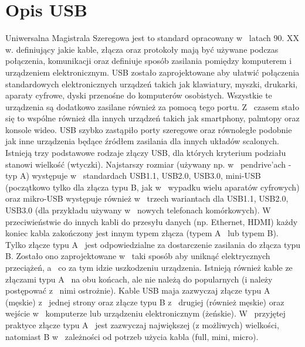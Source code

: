 \documentclass{BscUS}
\begin{document}
\section{Opis USB}
\label{USBStandardChapter}
Uniwersalna Magistrala Szeregowa jest to standard opracowany w~ latach 90. XX w. definiujący jakie kable, złącza oraz protokoły mają być używane podczas połączenia, komunikacji oraz definiuje sposób zasilania pomiędzy komputerem i~ urządzeniem elektronicznym. USB zostało zaprojektowane aby ułatwić połączenia standardowych elektronicznych urządzeń takich jak klawiatury, myszki, drukarki, aparaty cyfrowe, dyski przenośne do komputerów osobistych. Wszystkie te urządzenia są dodatkowo zasilane również za pomocą tego portu. Z~ czasem stało się to wspólne również dla innych urządzeń takich jak smartphony, palmtopy oraz konsole wideo.\cite{USBSystemArch, USB20Doc, USB30Doc}
\newline
\indent USB szybko zastąpiło porty szeregowe oraz równoległe podobnie jak inne urządzenia będące źródłem zasilania dla innych układów scalonych. Istnieją trzy podstawowe rodzaje złączy USB, dla których kryterium podziału stanowi wielkość (wtyczki). Najstarszy rozmiar (używany np. w~ pendrive'ach - typ A) występuje w~ standardach USB1.1, USB2.0, USB3.0, mini-USB (początkowo tylko dla złącza typu B, jak w~ wypadku wielu aparatów cyfrowych) oraz mikro-USB występuje również w~ trzech wariantach dla USB1.1, USB2.0, USB3.0 (dla przykładu używany w~ nowych telefonach komórkowych). 
\newline
\indent W~ przeciwieństwie do innych kabli do przesyłu danych (np. Ethernet, HDMI) każdy koniec kabla zakończony jest innym typem złącza (typem A~ lub typem B). Tylko złącze typu A~ jest odpowiedzialne za dostarczenie zasilania do złącza typu B. Zostało ono zaprojektowane w~ taki sposób aby uniknąć elektrycznych przeciążeń, a~ co za tym idzie uszkodzeniu urządzenia. Istnieją również kable ze złączami typu A~ na obu końcach, ale nie należą do popularnych (i należy postępować z~ nimi ostrożnie). Kable USB maja zazwyczaj złącze typu A~ (męskie) z~ jednej strony oraz złącze typu B z~ drugiej (również męskie) oraz wejście w~ komputerze lub urządzeniu elektronicznym (żeńskie). W~ przyjętej praktyce złącze typu A~ jest zazwyczaj największej (z możliwych) wielkości, natomiast B w~ zależności od potrzeb użycia kabla (full, mini, micro). \cite{USBSystemArch, USB20Doc, USB30Doc, DevUSBPher}
\end{document}
